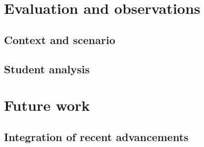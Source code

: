 \documentclass[letterpaper,12pt]{report}
\begin{document}
\chapter{Evaluation and observations}\label{chapter-seven}

\section{Context and scenario}\label{context-and-scenario}

\section{Student analysis}\label{student-analysis}

\chapter{Future work}\label{chapter-eight}

\section{Integration of recent
advancements}\label{integration-of-recent-advancements}
\end{document}
